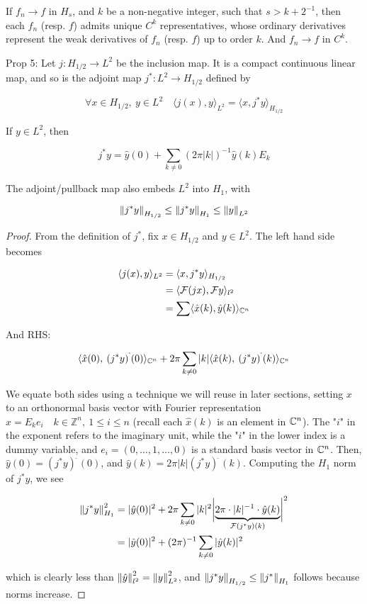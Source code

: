 \documentclass[../main-manifolds.tex]{subfiles}
\begin{document}
\begin{corollary}
If $f_n\to f$ in $H_s$, and $k$ be a non-negative integer, such that $s > k + 2^{-1}$, then each $f_n$ (resp. $f$) admits unique $C^k$ representatives, whose ordinary derivatives represent the weak derivatives of $f_n$ (resp. $f$) up to order $k$. And $f_n\to f$ in $C^k$.    
\end{corollary}
\begin{wts}
Prop 5: Let $j: H_{1/2}\to L^2$ be the inclusion map. It is a compact continuous linear map, and so is the adjoint map $j^*: L^2\to H_{1/2}$ defined by

$$
\forall x\in H_{1/2},\: y\in L^2\quad \langle j(x),y\rangle_{L^2} = \langle x,j^*y\rangle_{H_{1/2}}
$$

If $y\in L^2$, then

$$
j^*y = \hat{y}(0) + \sum_{k\neq 0}(2\pi\vert k\vert)^{-1}\hat{y}(k)E_k
$$

The adjoint/pullback map also embeds $L^2$ into $H_1$, with

$$
\norm{j^*y}_{H_{1/2}}\leq \norm{j^*y}_{H_1}\leq \norm{y}_{L^2}
$$    
\end{wts}
\begin{proof}
    From the definition of $j^*$, fix $x\in H_{1/2}$ and $y\in L^2$. The left hand side  becomes


\begin{align}
\langle j(x), y\rangle_{L^2} &= \langle x,j^*y\rangle_{H_{1/2}} \\
&= \langle \mathcal{F}(jx),\mathcal{F} y\rangle_{l^2}\\
&= \sum \langle \hat{x}(k),\hat{y}(k)\rangle_{{\mathbb{C}}^n}
\end{align}


And RHS:

$$
\langle \hat{x}(0),\:(j^*y)^{\hat{\:}}(0)\rangle_{{\mathbb{C}}^n} + 2\pi\sum_{k\neq 0}\vert k\vert\langle \hat{x}(k),\: (j^*y)^{\hat{\:}}(k)\rangle_{{\mathbb{C}}^n}
$$

We equate both sides using a technique we will reuse in later sections, setting $x$ to an orthonormal basis vector with Fourier representation $x = E_ke_i\quad k\in\mathbb{Z}^n,\: 1\leq i\leq n$ (recall each $\hat{x}(k)$ is an element in ${\mathbb{C}}^n$). The "$i$" in the exponent refers to the imaginary unit, while the "$i$" in the lower index is a dummy variable, and $e_i = (0,\ldots,1,\ldots,0)$ is a standard basis vector in ${\mathbb{C}}^n$. Then, $\hat{y}(0) = (j^*y)^{\hat{\:}}(0)$, and $\hat{y}(k)=2\pi \vert k\vert (j^*y)^{\hat{\:}}(k)$. Computing the $H_{1}$ norm of $j^*y$, we see

\begin{align}
\norm{j^*y}^2_{H_{1}} &= \vert \hat{y}(0)\vert^2 + 2\pi\sum_{k\neq 0}\vert k\vert^2\biggl\vert \underbrace{2\pi\cdot\vert k\vert^{-1}\cdot\hat{y}(k)}_{\mathcal{F}(j^*y)(k)}\biggr\vert^2\\
&= \vert \hat{y}(0)\vert^2 + (2\pi)^{-1}\sum_{k\neq 0}\vert \hat{y}(k)\vert^2
\end{align}

which is clearly less than $\norm{\hat{y}}^2_{l^2} = \norm{y}^2_{L^2}$, and $\norm{j^*y}_{H_{1/2}}\leq \norm{j^*}_{H_1}$ follows because norms increase.
\end{proof}
\end{document}
